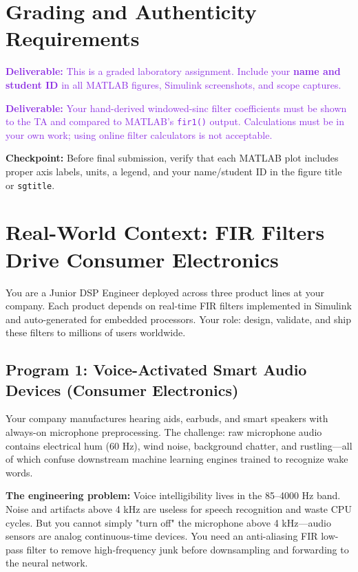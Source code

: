 \documentclass[11pt,letterpaper]{article}
\providecommand{\cpECE}[1]{\textcolor{OliveGreen}{\textbf{Checkpoint:} #1}}
\providecommand{\delECE}[1]{\textcolor{BlueViolet}{\textbf{Deliverable:} #1}}
\begin{document}
\clearpage

\section*{Grading and Authenticity Requirements}
\delECE{This is a graded laboratory assignment. Include your \textbf{name and student ID} in all MATLAB figures, Simulink screenshots, and scope captures.}

\delECE{Your hand-derived windowed-sinc filter coefficients must be shown to the TA and compared to MATLAB's \texttt{fir1()} output. Calculations must be in your own work; using online filter calculators is not acceptable.}

\cpECE{Before final submission, verify that each MATLAB plot includes proper axis labels, units, a legend, and your name/student ID in the figure title or \texttt{sgtitle}.}

\clearpage

\section{Real-World Context: FIR Filters Drive Consumer Electronics}

\noindent
You are a Junior DSP Engineer deployed across three product lines at your company. Each product depends on real-time FIR filters implemented in Simulink and auto-generated for embedded processors. Your role: design, validate, and ship these filters to millions of users worldwide.

\subsection{Program 1: Voice-Activated Smart Audio Devices (Consumer Electronics)}

Your company manufactures hearing aids, earbuds, and smart speakers with always-on microphone preprocessing. The challenge: raw microphone audio contains electrical hum (60 Hz), wind noise, background chatter, and rustling—all of which confuse downstream machine learning engines trained to recognize wake words.

\textbf{The engineering problem:} Voice intelligibility lives in the 85--4000 Hz band. Noise and artifacts above 4 kHz are useless for speech recognition and waste CPU cycles. But you cannot simply "turn off" the microphone above 4 kHz—audio sensors are analog continuous-time devices. You need an anti-aliasing FIR low-pass filter to remove high-frequency junk before downsampling and forwarding to the neural network.
\end{document}
